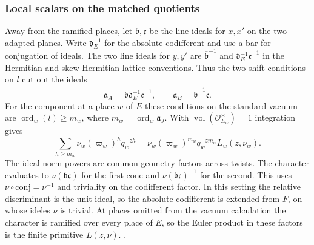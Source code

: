 \subsubsection{Local scalars on the matched quotients}
Away from the ramified places, let \(\mathfrak b,\mathfrak c\)
be the line ideals for \(x,x'\) on the two adapted planes. Write
\(\mathfrak d_E^{-1}\) for the absolute codifferent and use a bar for
conjugation of ideals. The two line ideals for \(y,y'\) are
\(\overline{\mathfrak b}^{-1}\) and
\(\mathfrak d_E^{-1}\overline{\mathfrak c}^{-1}\) in the Hermitian
and skew-Hermitian lattice conventions. Thus the two shift conditions
on \(l\) cut out the ideals
\[
 \mathfrak a_A=\mathfrak b\mathfrak d_E^{-1}\overline{\mathfrak c}^{-1},
 \qquad
 \mathfrak a_B=\overline{\overline{\mathfrak b}^{-1}\mathfrak c}.
\]
For the component at a place \(w\) of \(E\) these conditions on the
standard vacuum are \(\operatorname{ord}_w(l)\geq m_w\), where
\(m_w=\operatorname{ord}_w\mathfrak a_J\). With
\(\operatorname{vol}(\mathcal O_{E_w}^{\times})=1\) integration gives
\[
 \sum_{h\geq m_w}\nu_w(\varpi_w)^h q_w^{-zh}
   =\nu_w(\varpi_w)^{m_w}q_w^{-zm_w}L_w(z,\nu_w).
\]
The ideal norm powers are common geometry factors across twists. The
character evaluates to \(\nu(\mathfrak b\mathfrak c)\) for the first
cone and \(\nu(\mathfrak b\mathfrak c)^{-1}\) for the second. This
uses \(\nu\circ\mathrm{conj}=\nu^{-1}\) and triviality on the
codifferent factor. In this setting the relative discriminant is the
unit ideal, so the absolute codifferent is extended from \(F\), on
whose ideles \(\nu\) is trivial. At places omitted from the vacuum
calculation the character is ramified over every place of \(E\), so
the Euler product in these factors is the finite primitive \(L(z,\nu)\).
.

